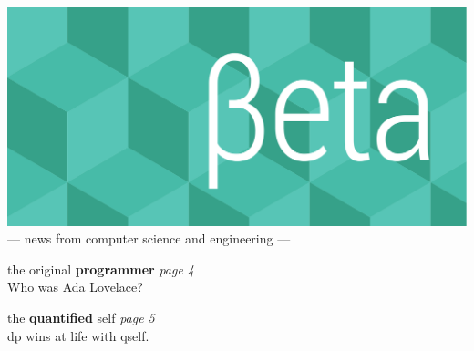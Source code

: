 \documentclass[twoside]{article}
\date{12 August 2015}
\begin{document}
\thispagestyle{empty}
\begingroup%
\vspace*{-3.5cm}\centering\hspace*{-2.8cm}%
\includegraphics[trim=0mm 20mm 0mm 0mm, clip, width=22cm]{../../style/beta-logo.pdf}%
\vspace{1em}
{\sffamily\fontsize{32pt}{32pt}\selectfont --- news from computer science and engineering ---}
\endgroup\vspace*{3ex}

\center
\vfill
{\sffamily\fontsize{56pt}{72pt}\selectfont the original {\bfseries programmer}}%
\hfill{\rmfamily\fontsize{14pt}{14pt}\selectfont\it page 4}\\
{\rmfamily\fontsize{16pt}{16pt} Who was Ada Lovelace?\hfill ~}

\vspace*{6em}
{\sffamily\fontsize{56pt}{72pt}\selectfont the {\bfseries quantified} self}%
\hfill{\rmfamily\fontsize{14pt}{14pt}\selectfont\it page 5}\\
{\rmfamily\fontsize{16pt}{16pt} dp wins at life with qself.\hfill ~}
\vfill

\endcenter
\end{document}

